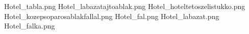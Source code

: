 Hotel_tabla.png
Hotel_labazatajtoablak.png
Hotel_hoteltetoszelistukko.png
Hotel_kozepsoparosablakfallal.png
Hotel_fal.png
Hotel_labazat.png
Hotel_falka.png
